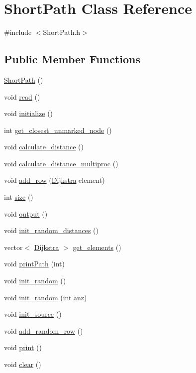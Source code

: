 \hypertarget{class_short_path}{\section{Short\-Path Class Reference}
\label{class_short_path}
}


{\ttfamily \#include $<$Short\-Path.\-h$>$}

\subsection*{Public Member Functions}
\begin{DoxyCompactItemize}
\item 
\hyperlink{class_short_path_aa1f54b3eb632252e0e4f34fed4110d54}{Short\-Path} ()
\item 
void \hyperlink{class_short_path_a977e9df25e204c35a343da0df6b38694}{read} ()
\item 
void \hyperlink{class_short_path_a113f044a61c1eacafb73df55e12f3803}{initialize} ()
\item 
int \hyperlink{class_short_path_ae218a65d8dd2620afc8c088679c5ab98}{get\-\_\-closest\-\_\-unmarked\-\_\-node} ()
\item 
void \hyperlink{class_short_path_af4ddb3c9a160c273bdc99b3fb43fd58d}{calculate\-\_\-distance} ()
\item 
void \hyperlink{class_short_path_a74f3fa59ffd3e061ef75a7962fbe3cfa}{calculate\-\_\-distance\-\_\-multiproc} ()
\item 
void \hyperlink{class_short_path_af65d23be9601ccf34becf9922c88c263}{add\-\_\-row} (\hyperlink{class_dijkstra}{Dijkstra} element)
\item 
int \hyperlink{class_short_path_a70c679581d979db7ac0cf8d0980651f5}{size} ()
\item 
void \hyperlink{class_short_path_aa4ede1b3713f60bef1f23193510199df}{output} ()
\item 
void \hyperlink{class_short_path_a24387db998bac1e88493dc4cf838a68b}{init\-\_\-random\-\_\-distances} ()
\item 
vector$<$ \hyperlink{class_dijkstra}{Dijkstra} $>$ \hyperlink{class_short_path_abf528c510136ea8014abfdd993949a02}{get\-\_\-elements} ()
\item 
void \hyperlink{class_short_path_a363cac67e1c10f524feab977073c35e9}{print\-Path} (int)
\item 
void \hyperlink{class_short_path_af3c6bd7d7b552ca6fa60b89a49db8566}{init\-\_\-random} ()
\item 
void \hyperlink{class_short_path_a1edee840fd8a1deec46d7c8ee4573bae}{init\-\_\-random} (int anz)
\item 
void \hyperlink{class_short_path_a388a3b66967f667a16b16f0f6fb044f3}{init\-\_\-source} ()
\item 
void \hyperlink{class_short_path_afa9098bdffcaaa0d77435dee10a2275f}{add\-\_\-random\-\_\-row} ()
\item 
void \hyperlink{class_short_path_a15edde62ae2c1a9f149815fb846c768e}{print} ()
\item 
void \hyperlink{class_short_path_a1c0cf18c306d022d72393979e37463c8}{clear} ()
\end{DoxyCompactItemize}


